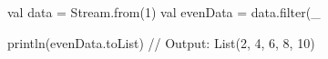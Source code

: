 val data = Stream.from(1)
val evenData = data.filter(_ %

println(evenData.toList) // Output: List(2, 4, 6, 8, 10)